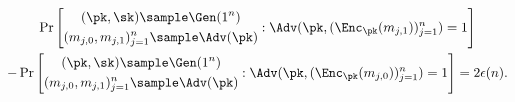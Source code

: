 \begin{answer}[ii]
    \begin{multline}\label{eq:p3-2-3}
        \Pr\left[\begin{gathered}
            (\pk, \sk)\sample\Gen(1^n)\\
            (m_{j,0},m_{j,1})_{j=1}^n \sample \Adv(\pk)
        \end{gathered}: \Adv(\pk,  (\Enc_\pk(m_{j,1}))_{j=1}^n)=1 \right]\\
        - \Pr\left[\begin{gathered}
            (\pk, \sk)\sample\Gen(1^n)\\
            (m_{j,0},m_{j,1})_{j=1}^n \sample \Adv(\pk)
        \end{gathered}: \Adv(\pk,  (\Enc_\pk(m_{j,0}))_{j=1}^n)=1 \right]
        = 2\epsilon(n).
    \end{multline}


\end{answer}

